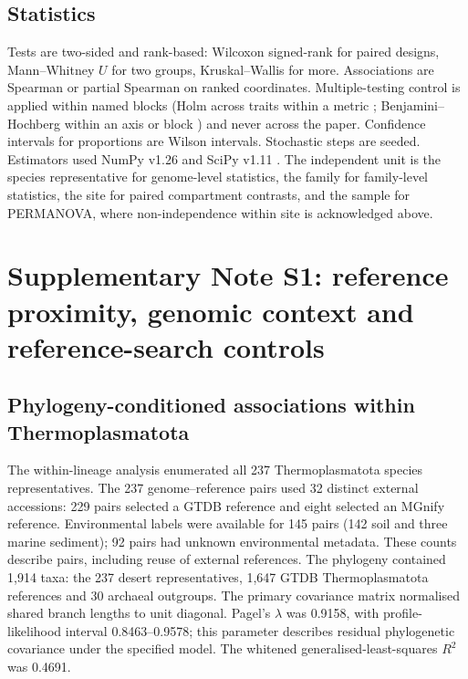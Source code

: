 \documentclass[11pt]{article}
\begin{document}
\subsection*{Statistics}
Tests are two-sided and rank-based: Wilcoxon signed-rank for paired designs, Mann--Whitney $U$ for
two groups, Kruskal--Wallis for more. Associations are Spearman or partial Spearman on ranked
coordinates. Multiple-testing control is applied within named blocks (Holm across traits within a
metric \citep{holm1979multiple}; Benjamini--Hochberg within an axis or block \citep{benjamini1995fdr})
and never across the paper. Confidence intervals for proportions are Wilson intervals. Stochastic
steps are seeded. Estimators used NumPy v1.26 \citep{harris2020numpy} and SciPy v1.11
\citep{virtanen2020scipy}. The independent unit is the species representative for genome-level
statistics, the family for family-level statistics, the site for paired compartment contrasts, and
the sample for PERMANOVA, where non-independence within site is acknowledged above.

\section*{Supplementary Note S1: reference proximity, genomic context and reference-search controls}

\subsection*{Phylogeny-conditioned associations within Thermoplasmatota}
The within-lineage analysis enumerated all 237 Thermoplasmatota species representatives.
The 237 genome--reference pairs used 32 distinct external accessions: 229 pairs selected a GTDB
reference and eight selected an MGnify reference. Environmental labels were available for 145
pairs (142 soil and three marine sediment); 92 pairs had unknown environmental metadata.
These counts describe pairs, including reuse of external references. The phylogeny contained
1{,}914 taxa: the 237 desert representatives, 1{,}647 GTDB Thermoplasmatota references and 30
archaeal outgroups. The primary covariance matrix normalised shared branch lengths to unit
diagonal. Pagel's $\lambda$ was 0.9158, with profile-likelihood interval 0.8463--0.9578;
this parameter describes residual phylogenetic covariance under the specified model.
The whitened generalised-least-squares $R^2$ was 0.4691.
\end{document}
